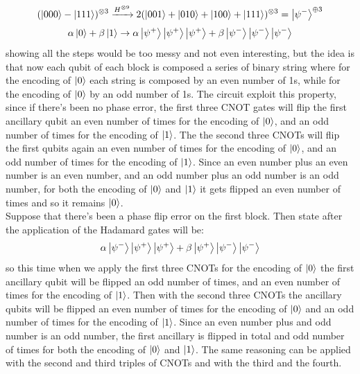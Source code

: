\documentclass{article}
\begin{document}
	\[  (\ket{000} - \ket{111})^{\otimes 3} \xrightarrow{H^{\otimes 9}} 2(\ket{001} + \ket{010} + \ket{100} + \ket{111})^{\otimes 3} = \ket{\psi^-}^{\oplus 3}\]
	\[\alpha \ket{0} + \beta\ket{1} \rightarrow \alpha\ket{\psi^+}\ket{\psi^+}\ket{\psi^+} + \beta\ket{\psi^-}\ket{\psi^-}\ket{\psi^-}\]
	showing all the steps would be too messy and not even interesting, but the idea is that now each qubit of each block is composed a series of binary string where for the encoding of $\ket{0}$ each string is composed by an even number of 1s, while for the encoding of $\ket{0}$ by an odd number of 1s. The circuit exploit this property, since if there's been no phase error, the first three CNOT gates will flip the first ancillary qubit an even number of times for the encoding of $\ket{0}$, and an odd number of times for the encoding of $\ket{1}$. The the second three CNOTs will flip the first qubits again an even number of times for the encoding of $\ket{0}$, and an odd number of times for the encoding of $\ket{1}$. Since an even number plus an even number is an even number, and an odd number plus an odd number is an odd number, for both the encoding of $\ket{0}$ and $\ket{1}$ it gets flipped an even number of times and so it remains $\ket{0}$.\\
	Suppose that there's been a phase flip error on the first block. Then state after the application of the Hadamard gates will be:
	\[ \alpha\ket{\psi^-}\ket{\psi^+}\ket{\psi^+} + \beta\ket{\psi^+}\ket{\psi^-}\ket{\psi^-}\]
	so this time when we apply the first three CNOTs for the encoding of $\ket{0}$ the first ancillary qubit will be flipped an odd number of times, and an even number of times for the encoding of $\ket{1}$. Then with the second three CNOTs the ancillary qubits will be flipped an even number of times for the encoding of $\ket{0}$ and an odd number of times for the encoding of $\ket{1}$. Since an even number plus and odd number is an odd number, the first ancillary is flipped in total and odd number of times for both the encoding of $\ket{0}$ and $\ket{1}$. The same reasoning can be applied with the second and third triples of CNOTs and with the third and the fourth.
	
\end{document}
